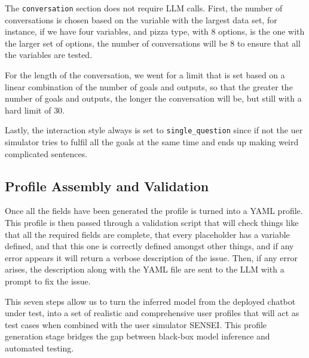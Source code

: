 The \texttt{conversation} section does not require \ac{LLM} calls.
First, the number of conversations is chosen
based on the variable with the largest data set,
for instance, if we have four variables,
and pizza type, with $8$ options, is the one with the larger set of options,
the number of conversations will be $8$ to ensure that all the variables are tested.

For the length of the conversation,
we went for a limit that is set based
on a linear combination of the number of goals and outputs,
so that the greater the number of goals and outputs,
the longer the conversation will be,
but still with a hard limit of $30$.

Lastly, the interaction style always is set to \texttt{single\_question}
since if not the uer simulator tries to fulfil all the goals at the same time
and ends up making weird complicated sentences.

\subsection{Profile Assembly and Validation}

Once all the fields have been generated
the profile is turned into a YAML profile.
This profile is then passed through a validation script
that will check things like that all the required fields are complete,
that every placeholder has a variable defined,
and that this one is correctly defined
amongst other things,
and if any error appears it will return a verbose description of the issue.
Then, if any error arises, the description along with the YAML file
are sent to the \ac{LLM} with a prompt to fix the issue.


This seven steps allow us to turn the inferred model
from the deployed chatbot under test,
into a set of realistic and comprehensive user profiles
that will act as test cases when combined with the user simulator SENSEI.
This profile generation stage bridges the gap between
black-box model inference and automated testing.
